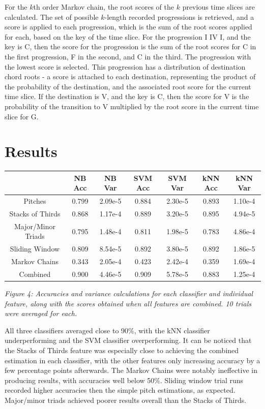 \documentclass[12pt]{article}
\begin{document}
For the $k$th order Markov chain, the root scores of the $k$ previous time slices are calculated. The set of possible $k$-length recorded progressions is retrieved, and a score is applied to each progression, which is the sum of the root scores applied for each, based on the key of the time slice. For the progression I IV I, and the key is C, then the score for the progression is the sum of the root scores for C in the first progression, F in the second, and C in the third. The progression with the lowest score is selected. This progression has a distribution of destination chord roots - a score is attached to each destination, representing the product of the probability of the destination, and the associated root score for the current time slice. If the destination is V, and the key is C, then the score for V is the probability of the transition to V multiplied by the root score in the current time slice for G.

\section{Results}
\begin{center}
  \begin{tabular}{ c | c  c | c  c | c c}
    & NB Acc & NB Var & SVM Acc & SVM Var & kNN Acc & kNN Var \\ \hline
   Pitches & 0.799 & 2.09e-5 & 0.884 & 2.30e-5 & 0.893 & 1.10e-4\\	
Stacks of Thirds & 0.868 & 1.17e-4 & 0.889 & 3.20e-5 & 0.895 & 4.94e-5\\	
Major/Minor Triads & 0.795 & 1.48e-4 & 0.811 & 1.98e-5 & 0.783 & 4.86e-4\\	
Sliding Window & 0.809 & 8.54e-5 & 0.892 & 3.80e-5 & 0.892 & 1.86e-5\\	
Markov Chains & 0.343 & 2.05e-4 & 0.423 & 2.42e-4 & 0.359 & 1.69e-4\\ \hline
Combined & 0.900 & 4.46e-5 & 0.909 & 5.78e-5 & 0.883 & 1.25e-4\\	
  \end{tabular}
\end{center}
\begin{center}\emph{Figure 4: Accuracies and variance calculations for each classifier and individual feature, along with the scores obtained when all features are combined. 10 trials were averaged for each.}\\ \end{center}
All three classifiers averaged close to 90\%, with the kNN classifier underperforming and the SVM classifier overperforming. It can be noticed that the Stacks of Thirds feature was especially close to achieving the combined estimation in each classifier, with the other features only increasing accuracy by a few percentage points afterwards. The Markov Chains were notably ineffective in producing results, with accuracies well below 50\%. Sliding window trial runs recorded higher accuracies then the simple pitch estimations, as expected. Major/minor triads achieved poorer results overall than the Stacks of Thirds.\\
\end{document}
